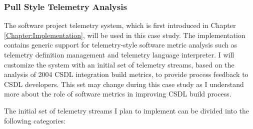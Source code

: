 \subsubsection{Pull Style Telemetry Analysis}

The software project telemetry system, which is first introduced in Chapter \ref{Chapter:Implementation}, will be used in this case study. The implementation contains generic support for telemetry-style software metric analysis such as telemetry definition management and telemetry language interpreter. I will customize the system with an initial set of telemetry streams, based on the analysis of 2004 CSDL integration build metrics, to provide process feedback to CSDL developers. This set may change during this case study as I understand more about the role of software metrics in improving CSDL build process.

The initial set of telemetry streams I plan to implement can be divided into the following categories:

